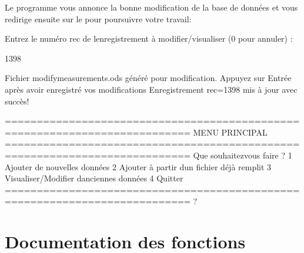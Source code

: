 \documentclass[letterpaper,10pt,french]{sphinxmanual}
\begin{document}
\sphinxAtStartPar
Le programme vous annonce la bonne modification de la base de données et vous redirige ensuite sur le  pour poursuivre votre travail:

\begin{sphinxVerbatim}[commandchars=\\\{\}]
Entrez le numéro \PYGZsq{}rec\PYGZsq{} de l\PYGZsq{}enregistrement à modifier/visualiser (0 pour annuler) :

\PYGZhy{}\PYGZgt{} 1398

Fichier modify\PYGZus{}measurements.ods généré pour modification.
Appuyez sur Entrée après avoir enregistré vos modifications
Enregistrement rec=1398 mis à jour avec succès!

===========================================================================
MENU PRINCIPAL
===========================================================================
Que souhaitez\PYGZhy{}vous faire ?
1 \PYGZhy{} Ajouter de nouvelles données
2 \PYGZhy{} Ajouter à partir d\PYGZsq{}un fichier déjà remplit
3 \PYGZhy{} Visualiser/Modifier d\PYGZsq{}anciennes données
4 \PYGZhy{} Quitter
===========================================================================
?
\end{sphinxVerbatim}

\sphinxstepscope


\chapter{Documentation des fonctions}
\label{\detokenize{library:module-lib_sql}}\label{\detokenize{library:documentation-des-fonctions}}\label{\detokenize{library::doc}}
\end{document}
